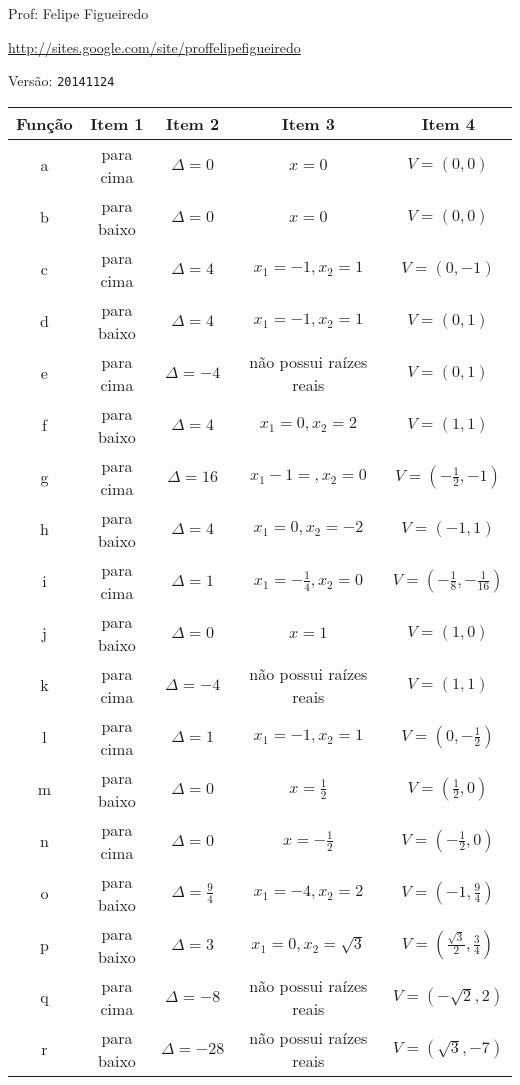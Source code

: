 \documentclass[a4paper]{article}
\begin{document}
\parbox[c]{.825\textwidth}{\raggedright%
{Prof: Felipe Figueiredo\par}
{\url{http://sites.google.com/site/proffelipefigueiredo}}
}

Versão: \verb|20141124|


\begin{tabular}{|c|c|c|c|c|}
  \hline
  Função & Item 1 & Item 2 & Item 3 & Item 4\\
  \hline
  \hline
  a & para cima & $\Delta = 0$ & $x=0$ & $V=(0,0)$\\
  b & para baixo & $\Delta = 0$ & $x = 0$ & $V=(0,0)$\\
  c & para cima & $\Delta = 4$ & $x_1 = -1, x_2 = 1$ & $V=(0,-1)$\\
  d & para baixo & $\Delta = 4$ & $x_1 = -1,x_2 =  1$ & $V=(0,1)$\\
  e & para cima & $\Delta = -4$ & não possui raízes reais & $V=(0,1)$\\
  f & para baixo & $\Delta = 4$ & $x_1 =0, x_2 = 2$ & $V=(1,1)$\\
  g & para cima & $\Delta = 16$ & $x_1 -1= , x_2 = 0$ & $V=(-\frac{1}{2},-1)$\\
  h & para baixo & $\Delta = 4$ & $x_1 = 0, x_2 = -2$ & $V=(-1,1)$\\
  i & para cima & $\Delta = 1$ & $x_1 = -\frac{1}{4}, x_2 = 0$ & $V=(-\frac{1}{8},-\frac{1}{16})$\\
  j & para baixo & $\Delta = 0$ & $x = 1$ & $V=(1,0)$\\
  k & para cima & $\Delta = -4$ & não possui raízes reais & $V=(1,1)$\\
  l & para cima & $\Delta = 1$ & $x_1 = -1, x_2 = 1$ & $V=(0,-\frac{1}{2})$\\
  m & para baixo & $\Delta = 0$ & $x = \frac{1}{2}$ & $V=(\frac{1}{2},0)$\\
  n & para cima & $\Delta = 0$ & $x = -\frac{1}{2}$ & $V=(-\frac{1}{2},0)$\\
  o & para baixo & $\Delta = \frac{9}{4}$ & $x_1 = -4, x_2 = 2$ & $V=(-1,\frac{9}{4})$\\
  p & para baixo & $\Delta = 3$ & $x_1 = 0, x_2 = \sqrt{3}$ & $V=(\frac{\sqrt{3}}{2},\frac{3}{4})$\\
  q & para cima & $\Delta = -8$ & não possui raízes reais & $V=(-\sqrt{2},2)$\\
  r & para baixo & $\Delta = -28$ & não possui raízes reais & $V=(\sqrt{3},-7)$\\
  \hline
    

\end{tabular}


\end{document}
